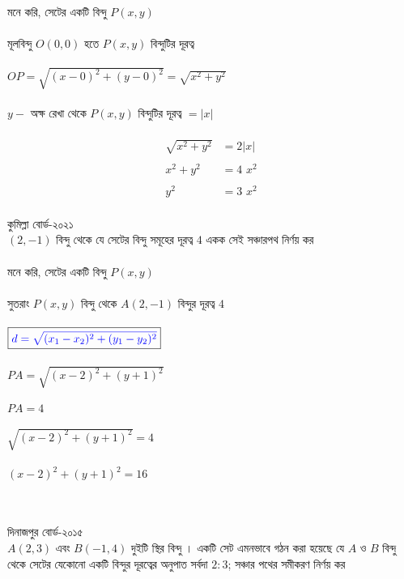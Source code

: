 \documentclass{article}
\begin{document}
	\\
	মনে করি, সেটের একটি বিন্দু $P(x,y)$ \\
	\\
	মূলবিন্দু $O(0,0)$  হতে $P(x,y)$ বিন্দুটির দূরত্ব\\
	\\ 
	$OP=\sqrt{(x-0)^2+(y-0)^2}=\sqrt{x^2+y^2}$\\
	\\ 
	$y-$ অক্ষ রেখা থেকে $P(x,y)$ বিন্দুটির দূরত্ব $=|x|$\\
	\\ 
	\begin{align*}
		\sqrt{x^2+y^2}&=2|x|\\
		\\
		x^2+y^2&=4\,\,x^2\\
		\\
		y^2&=3\,\,x^2
	\end{align*}
\\
	কুমিল্লা বোর্ড-২০২১\\ 
$(2,-1)$ বিন্দু থেকে যে সেটের বিন্দু সমূহের দূরত্ব  $4$ একক সেই সঞ্চারপথ নির্ণয় কর\\ 
\\
মনে করি, সেটের একটি বিন্দু $P(x,y)$ \\
\\
সুতরাং $P(x,y)$  বিন্দু থেকে $A(2,-1)$ বিন্দুর দূরত্ব  $4$ \\
\\
$\boxed{\textcolor{blue}{d=\sqrt{(x_1-x_2)^2+(y_1-y_2)^2}}}$\\
\\ 
$PA=\sqrt{(x-2)^2+(y+1)^2}$\\
\\
$PA=4$\\
\\
$\sqrt{(x-2)^2+(y+1)^2}=4$\\
\\
$(x-2)^2+(y+1)^2=16$\\ 
\\
\\
দিনাজপুর বোর্ড-২০১৫\\ 
$A(2,3)$ এবং  $B(-1,4)$ দুইটি স্থির বিন্দু । একটি সেট এমনভাবে গঠন করা হয়েছে যে  $A$ ও  $B$ বিন্দু থেকে সেটের যেকোনো একটি বিন্দুর দূরত্বের অনুপাত সর্বদা $2:3$;  সঞ্চার পথের সমীকরণ নির্ণয় কর  \\
\end{document}
